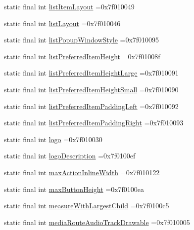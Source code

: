 \begin{DoxyCompactItemize}
static final int \hyperlink{classproject4_1_1xaria_1_1R_1_1attr_aaff15f9ea72df9f25ec6cb31f6f891eb}{list\+Item\+Layout} =0x7f010049
\item 
static final int \hyperlink{classproject4_1_1xaria_1_1R_1_1attr_a336b946d82b58509bc72ccc23ffce822}{list\+Layout} =0x7f010046
\item 
static final int \hyperlink{classproject4_1_1xaria_1_1R_1_1attr_a77f676fad01374f9af35981125b8b457}{list\+Popup\+Window\+Style} =0x7f010095
\item 
static final int \hyperlink{classproject4_1_1xaria_1_1R_1_1attr_aff9b727d05ae5a7e4979a7d9b32cbce0}{list\+Preferred\+Item\+Height} =0x7f01008f
\item 
static final int \hyperlink{classproject4_1_1xaria_1_1R_1_1attr_a3cfdfb0977753f1d35ce98252e735095}{list\+Preferred\+Item\+Height\+Large} =0x7f010091
\item 
static final int \hyperlink{classproject4_1_1xaria_1_1R_1_1attr_a06003d185f8e606478018a782d0d8c95}{list\+Preferred\+Item\+Height\+Small} =0x7f010090
\item 
static final int \hyperlink{classproject4_1_1xaria_1_1R_1_1attr_a96f5187972e26c32886ae99940851b40}{list\+Preferred\+Item\+Padding\+Left} =0x7f010092
\item 
static final int \hyperlink{classproject4_1_1xaria_1_1R_1_1attr_a0ac3520ccc66f398826814f8ccff1b03}{list\+Preferred\+Item\+Padding\+Right} =0x7f010093
\item 
static final int \hyperlink{classproject4_1_1xaria_1_1R_1_1attr_a3320dd5ff1fd6f9ac717bba5848ca42f}{logo} =0x7f010030
\item 
static final int \hyperlink{classproject4_1_1xaria_1_1R_1_1attr_a4609e2eefed62f039512caaee341b8ce}{logo\+Description} =0x7f0100ef
\item 
static final int \hyperlink{classproject4_1_1xaria_1_1R_1_1attr_a9dc6bc2417f821003beb6d68273b0654}{max\+Action\+Inline\+Width} =0x7f010122
\item 
static final int \hyperlink{classproject4_1_1xaria_1_1R_1_1attr_aae4378b5d9b6ee4c1c76ab18aa350ae0}{max\+Button\+Height} =0x7f0100ea
\item 
static final int \hyperlink{classproject4_1_1xaria_1_1R_1_1attr_adea6c7a4f2f29b21e559fe2cdc96d23c}{measure\+With\+Largest\+Child} =0x7f0100c5
\item 
static final int \hyperlink{classproject4_1_1xaria_1_1R_1_1attr_ad0a034729ca6de0e240f0df38c184644}{media\+Route\+Audio\+Track\+Drawable} =0x7f010005
\item 

\end{DoxyCompactItemize}
